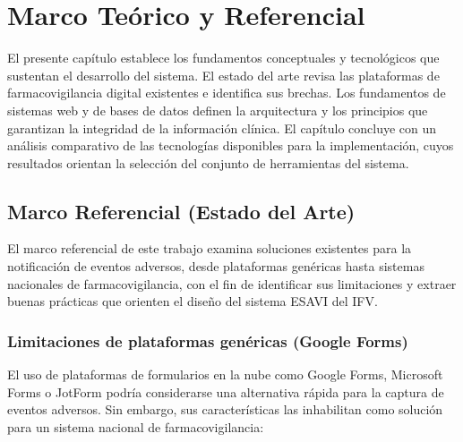\chapter{Marco Teórico y Referencial}\label{chapter:marco-teorico-referencial}


El presente capítulo establece los fundamentos conceptuales y tecnológicos que sustentan el desarrollo del sistema. El estado del arte revisa las plataformas de farmacovigilancia digital existentes e identifica sus brechas. Los fundamentos de sistemas web y de bases de datos definen la arquitectura y los principios que garantizan la integridad de la información clínica. El capítulo concluye con un análisis comparativo de las tecnologías disponibles para la implementación, cuyos resultados orientan la selección del conjunto de herramientas del sistema.


\section{Marco Referencial (Estado del Arte)}

El marco referencial de este trabajo examina soluciones existentes para la notificación de eventos adversos, desde plataformas genéricas hasta sistemas nacionales de farmacovigilancia, con el fin de identificar sus limitaciones y extraer buenas prácticas que orienten el diseño del sistema ESAVI del IFV.

\subsection{Limitaciones de plataformas genéricas (Google Forms)}

El uso de plataformas de formularios en la nube como Google Forms, Microsoft Forms o JotForm podría considerarse una alternativa rápida para la captura de eventos adversos. Sin embargo, sus características las inhabilitan como solución para un sistema nacional de farmacovigilancia:

